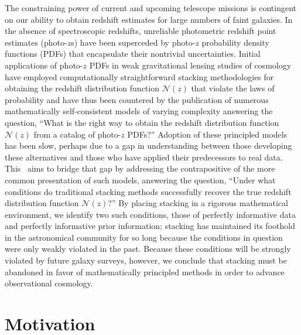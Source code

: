 The constraining power of current and upcoming telescope missions is contingent on our ability to obtain redshift estimates for large numbers of faint galaxies.
In the absence of spectroscopic redshifts, unreliable photometric redshift point estimates (photo-$z$s) have been superceded by photo-$z$ probability density functions (PDFs) that encapsulate their nontrivial uncertainties.
Initial applications of photo-$z$ PDFs in weak gravitational lensing studies of cosmology have employed computationally straightforward stacking methodologies for obtaining the redshift distribution function $\mathcal{N}(z)$ that violate the laws of probability and have thus been countered by the publication of numerous mathematically self-consistent models of varying complexity answering the question, ``What is the right way to obtain the redshift distribution function $\mathcal{N}(z)$ from a catalog of photo-$z$ PDFs?''
Adoption of these principled models has been slow, perhaps due to a gap in understanding between those developing these alternatives and those who have applied their predecessors to real data.
This \paper\ aims to bridge that gap by addressing the contrapositive of the more common presentation of such models, answering the question, ``Under what conditions do traditional stacking methods successfully recover the true redshift distribution function $\mathcal{N}(z)$?''
By placing stacking in a rigorous mathematical environment, we identify two such conditions, those of perfectly informative data and perfectly informative prior information; 
stacking has maintained its foothold in the astronomical community for so long because the conditions in question were only weakly violated in the past.
Because these conditions will be strongly violated by future galaxy surveys, however, we conclude that stacking must be abandoned in favor of mathematically principled methods in order to advance observational cosmology.

\section{Motivation}

